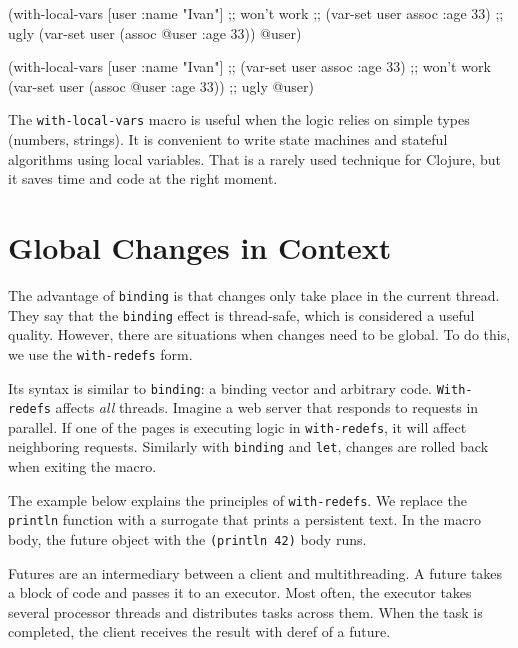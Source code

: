 \ifx\DEVICETYPE\MOBILE

\begin{clojure}
(with-local-vars [user {:name "Ivan"}]
  ;; won't work
  ;; (var-set user assoc :age 33)
  ;; ugly
  (var-set user (assoc @user :age 33))
  @user)
\end{clojure}

\else

\begin{clojure}
(with-local-vars [user {:name "Ivan"}]
  ;; (var-set user assoc :age 33) ;; won't work
  (var-set user (assoc @user :age 33)) ;; ugly
  @user)
\end{clojure}

\fi

The \verb|with-local-vars| macro is useful when the logic relies on simple types (numbers, strings).
It is convenient to write state machines and stateful algorithms using local variables.
That is a rarely used technique for Clojure, but it saves time and code at the right moment.

\section{Global Changes in Context}


\label{with-redefs}

The advantage of \verb|binding| is that changes only take place in the current thread.
They say that the \verb|binding| effect is thread-safe, which is considered a useful quality.
However, there are situations when changes need to be global.
To do this, we use the \verb|with-redefs| form.

\mnoindent
Its syntax is similar to \verb|binding|: a binding vector and arbitrary code. \verb|With-redefs| affects \emph{all} threads.
Imagine a web server that responds to requests in parallel.
If one of the pages is executing logic in \verb|with-redefs|, it will affect neighboring requests.
Similarly with \verb|binding| and \verb|let|, changes are rolled back when exiting the macro.

The example below explains the principles of \texttt{with\--redefs}.
We replace the \verb|println| function with a surrogate that prints a persistent text.
In the macro body, the future object with the \verb|(println 42)| body runs.


Futures are an intermediary between a client and multithreading.
A future takes a block of code and passes it to an executor.
Most often, the executor takes several processor threads and distributes tasks across them.
When the task is completed, the client receives the result with deref of a future.


